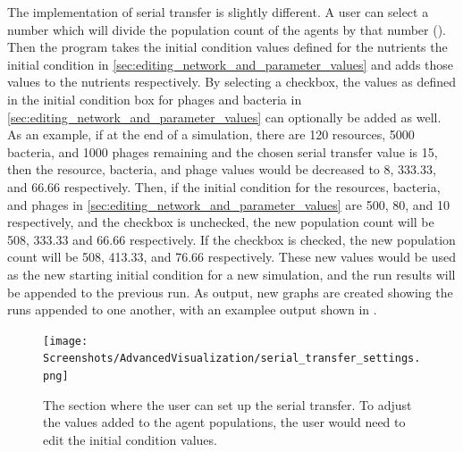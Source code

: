 The implementation of serial transfer is slightly different. 
A user can select a number which will divide the population count of the agents by that number (). 
Then the program takes the initial condition values defined for the nutrients the initial condition in \ref{sec:editing_network_and_parameter_values} and adds those values to the nutrients respectively. 
By selecting a checkbox, the values as defined in the initial condition box for phages and bacteria in \ref{sec:editing_network_and_parameter_values} can optionally be added as well. 
As an example, if at the end of a simulation, there are 120 resources, 5000 bacteria, and 1000 phages remaining and the chosen serial transfer value is 15, then the resource, bacteria, and phage values would be decreased to 8, 333.33, and 66.66 respectively. 
Then, if the initial condition for the resources, bacteria, and phages in \ref{sec:editing_network_and_parameter_values} are 500, 80, and 10 respectively, and the checkbox is unchecked, the new population count will be 508, 333.33 and 66.66 respectively. 
If the checkbox is checked, the new population count will be 508, 413.33, and 76.66 respectively. 
These new values would be used as the new starting initial condition for a new simulation, and the run results will be appended to the previous run. 
As output, new graphs are created showing the runs appended to one another, with an examplee output shown in . 
\begin{figure}
    \centering
    \texttt{[image: Screenshots/AdvancedVisualization/serial\_transfer\_settings.png]}
    \caption{
        The section where the user can set up the serial transfer. 
        To adjust the values added to the agent populations, the user would need to edit the initial condition values. 
    }
    \label{fig:ss:av:serial_transfer_settings}
\end{figure}
